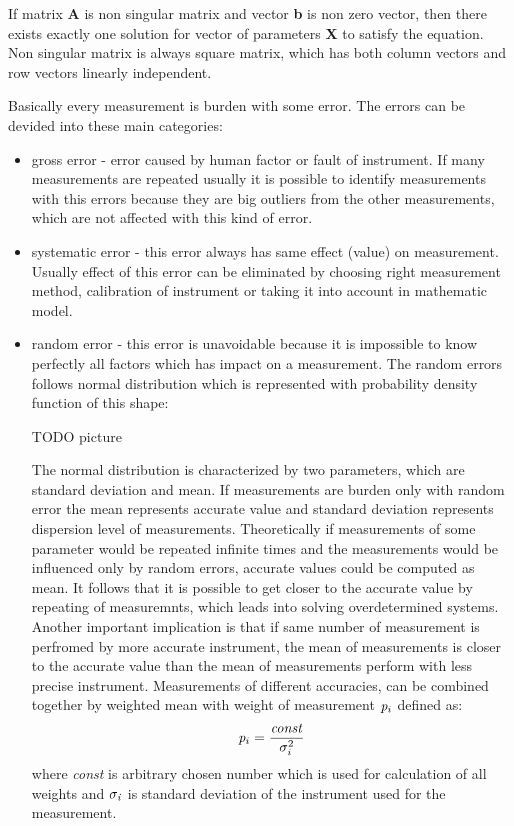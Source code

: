 \documentclass[a4paper,12pt]{report}
\newcommand{\ematr}[1]{
{\bf #1}
}
\newcommand{\evect}[1]{
{\bf #1}
}
\newcommand{\escal}[1]{
{\it #1}
}
\begin{document}
If matrix \ematr{A} is 
non singular matrix  and vector \evect{b} is non zero vector, then there exists exactly one solution 
for vector of parameters  \evect{X} to satisfy the equation. Non singular matrix is always square matrix, 
which has both column vectors and row vectors linearly independent. 

Basically every measurement is burden with some error. The errors can be devided into these main categories:  
\begin{itemize}
\item gross error - error caused by human factor or fault of instrument. If many measurements are repeated
usually it is possible to identify measurements with this errors because they are big outliers from the other measurements, which are not affected with this 
kind of error.
\item systematic error - this error always has same effect (value) on measurement.  Usually effect of this error can be 
eliminated by choosing right measurement method, calibration of instrument or taking it into account in  mathematic model.
\item random error - this error is unavoidable because it is impossible to know perfectly all factors which has impact 
on a measurement. The random errors follows normal distribution which is represented with probability density function of this shape:

TODO picture


The normal distribution is characterized by two parameters, which are standard deviation and  mean. 
If measurements are burden only with random error the mean represents accurate value and standard deviation represents 
dispersion level of measurements. 
Theoretically  if measurements of some parameter would be repeated infinite times and the measurements would be influenced only by random errors,
accurate values could be computed as mean.
It follows that it is possible to get closer to the accurate value by repeating of measuremnts, which 
leads into solving overdetermined systems. Another important implication is that if same number of measurement is perfromed by more accurate 
instrument, the mean of measurements is closer to the accurate value than the mean of measurements perform with less precise instrument.
Measurements of different accuracies, can be combined together by weighted mean
with weight of measurement $\escal{p}_{i}$ defined as:
\begin{equation}
\label{eq:wmean}
\escal{p}_{i} = \frac{\escal{const}}{\escal{\sigma}_{i}^{2}}
\end{equation} 
where \escal{const} is arbitrary chosen number which is used for calculation of all weights 
and $\escal{\sigma_{i}}$ is standard deviation of the instrument used for the measurement.
\end{itemize}
\end{document}
